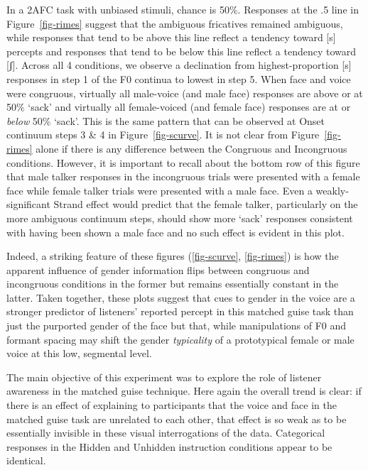 \documentclass[
  letterpaper,
  DIV=11,
  numbers=noendperiod]{scrartcl}
\begin{document}
In a 2AFC task with unbiased stimuli, chance is 50\%. Responses at the
.5 line in Figure~\ref{fig-rimes} suggest that the ambiguous fricatives
remained ambiguous, while responses that tend to be above this line
reflect a tendency toward {[}s{]} percepts and responses that tend to be
below this line reflect a tendency toward {[}ʃ{]}. Across all 4
conditions, we observe a declination from highest-proportion {[}s{]}
responses in step 1 of the F0 continua to lowest in step 5. When face
and voice were congruous, virtually all male-voice (and male face)
responses are above or at 50\% `sack' and virtually all female-voiced
(and female face) responses are at or \emph{below} 50\% `sack'. This is
the same pattern that can be observed at Onset continuum steps 3 \& 4 in
Figure~\ref{fig-scurve}. It is not clear from Figure~\ref{fig-rimes}
alone if there is any difference between the Congruous and Incongruous
conditions. However, it is important to recall about the bottom row of
this figure that male talker responses in the incongruous trials were
presented with a female face while female talker trials were presented
with a male face. Even a weakly-significant Strand effect would predict
that the female talker, particularly on the more ambiguous continuum
steps, should show more `sack' responses consistent with having been
shown a male face and no such effect is evident in this plot.

Indeed, a striking feature of these figures
(\ref{fig-scurve}, \ref{fig-rimes}) is how the apparent influence of
gender information flips between congruous and incongruous conditions in
the former but remains essentially constant in the latter. Taken
together, these plots suggest that cues to gender in the voice are a
stronger predictor of listeners' reported percept in this matched guise
task than just the purported gender of the face but that, while
manipulations of F0 and formant spacing may shift the gender
\emph{typicality} of a prototypical female or male voice at this low,
segmental level.

The main objective of this experiment was to explore the role of
listener awareness in the matched guise technique. Here again the
overall trend is clear: if there is an effect of explaining to
participants that the voice and face in the matched guise task are
unrelated to each other, that effect is so weak as to be essentially
invisible in these visual interrogations of the data. Categorical
responses in the Hidden and Unhidden instruction conditions appear to be
identical.
\end{document}
